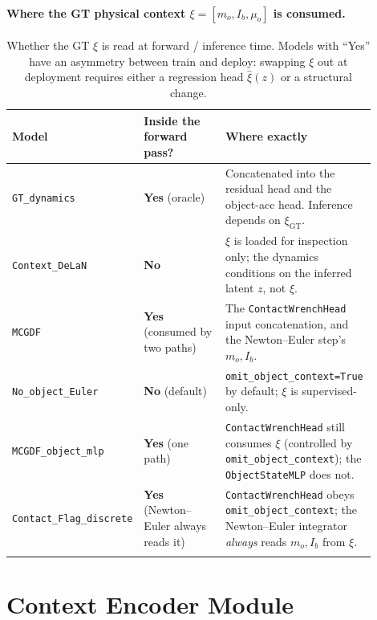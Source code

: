 \documentclass[11pt]{article}
\begin{document}
\paragraph{Where the GT physical context $\xi = [m_o, I_b, \mu_o]$ is consumed.}
\begin{longtable}{p{0.18\linewidth} p{0.30\linewidth} p{0.42\linewidth}}
\toprule
Model & Inside the forward pass? & Where exactly \\
\midrule
\texttt{GT\_dynamics}            & \textbf{Yes} (oracle)         & Concatenated into the residual head and the object-acc head.  Inference depends on $\xi_{\mathrm{GT}}$. \\
\texttt{Context\_DeLaN}          & \textbf{No}                   & $\xi$ is loaded for inspection only; the dynamics conditions on the inferred latent $z$, not $\xi$. \\
\texttt{MCGDF}                   & \textbf{Yes} (consumed by two paths) & The \texttt{ContactWrenchHead} input concatenation, and the Newton--Euler step's $m_o, I_b$. \\
\texttt{No\_object\_Euler}       & \textbf{No} (default)          & \texttt{omit\_object\_context=True} by default; $\xi$ is supervised-only. \\
\texttt{MCGDF\_object\_mlp}      & \textbf{Yes} (one path)        & \texttt{ContactWrenchHead} still consumes $\xi$ (controlled by \texttt{omit\_object\_context}); the \texttt{ObjectStateMLP} does not. \\
\texttt{Contact\_Flag\_discrete} & \textbf{Yes} (Newton--Euler always reads it) & \texttt{ContactWrenchHead} obeys \texttt{omit\_object\_context}; the Newton--Euler integrator \emph{always} reads $m_o, I_b$ from $\xi$. \\
\bottomrule
\caption{Whether the GT $\xi$ is read at forward / inference time.
Models with ``Yes'' have an asymmetry between train and deploy:
swapping $\xi$ out at deployment requires either a regression head
$\hat \xi(z)$ or a structural change.}
\label{tab:cmp-xi}
\end{longtable}

\section{Context Encoder Module}
\end{document}
